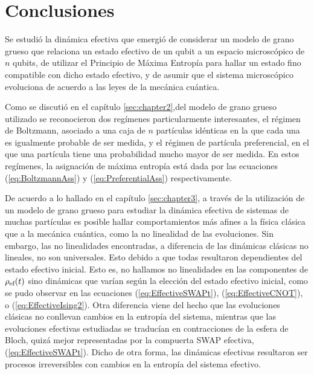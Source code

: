 \chapter{Conclusiones}



Se estudió la dinámica efectiva que emergió de considerar un modelo de grano grueso que relaciona un estado efectivo de un qubit a un espacio microscópico de $n$ qubits, de utilizar el Principio de Máxima Entropía para hallar un estado fino compatible con dicho estado efectivo, y de asumir que el sistema microscópico evoluciona de acuerdo a las leyes de la mecánica cuántica.


Como se discutió en el capítulo \ref{sec:chapter2},del modelo de grano grueso utilizado se reconocieron dos regímenes particularmente interesantes, el régimen de Boltzmann, asociado a una caja de $n$ partículas idénticas en la que cada una es igualmente probable de ser medida, y el régimen de partícula preferencial, en el que una partícula tiene una probabilidad mucho mayor de ser medida. En estos regímenes, la asignación de máxima entropía está dada por las ecuaciones (\ref{eq:BoltzmannAss}) y (\ref{eq:PreferentialAss}) respectivamente.

De acuerdo a lo hallado en el capítulo \ref{sec:chapter3}, a través de la utilización de un modelo de grano grueso para estudiar la dinámica efectiva de sistemas de muchas partículas es posible hallar comportamientos más afines a la física clásica que a la mecánica cuántica, como la no linealidad de las evoluciones. Sin embargo, las no linealidades encontradas, a diferencia de las dinámicas clásicas no lineales, no son universales. Esto debido a que todas resultaron dependientes del estado efectivo inicial. Esto es, no hallamos no linealidades en las componentes de $\rho_{\text{ef}}(t)$ sino dinámicas que varían según la elección del estado efectivo inicial, como se pudo observar en las ecuaciones (\ref{eq:EffectiveSWAPt}), (\ref{eq:EffectiveCNOT}), o (\ref{eq:EffectiveIsing2}). Otra diferencia viene del hecho que las evoluciones clásicas no conllevan cambios en la entropía del sistema, mientras que las evoluciones efectivas estudiadas se traducían en contracciones de la esfera de Bloch, quizá mejor representadas por la compuerta SWAP efectiva, (\ref{eq:EffectiveSWAPt}). Dicho de otra forma, las dinámicas efectivas resultaron ser procesos irreversibles con cambios en la entropía del sistema efectivo.


